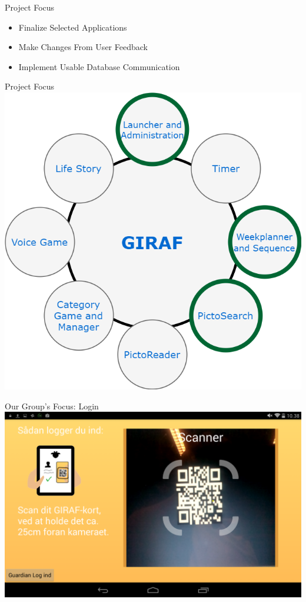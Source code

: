 \begin{frame}{Project Focus}
\begin{itemize}
	\item Finalize Selected Applications
	\item Make Changes From User Feedback
	\item Implement Usable Database Communication
\end{itemize}
\end{frame}

\begin{frame}{Project Focus}
\includegraphics[scale=0.32]{figures/GirafFocus.png} 
\end{frame}

\begin{frame}{Our Group's Focus: Login}
\includegraphics[scale=0.21]{figures/Login.png} 
\end{frame}

